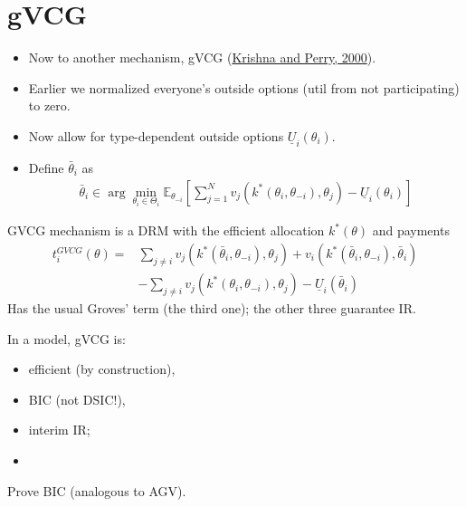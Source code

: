 \documentclass[english,handout]{beamer}		%
\def\lyxframeend{} %
\begin{document}
\section{gVCG}

\begin{itemize}
	\item Now to another mechanism, gVCG (\href{https://sites.google.com/site/vjkrishna/research}{Krishna and Perry, 2000}).
	\item Earlier we normalized everyone's outside options (util from not participating) to zero.
	\item Now allow for type-dependent outside options $\underline{U}_i (\theta_i)$.
	\pause\medskip
	\item Define  $\bar{\theta}_i$ as
	\begin{align*}
	\bar{\theta}_i \in \arg \min_{\theta_i \in \Theta_i} \mathbb{E}_{\theta_{-i}} \left[ \sum_{j=1}^{N} v_j (k^*(\theta_i,\theta_{-i}),\theta_j) - \underline{U}_i (\theta_i) \right]
	\end{align*}
\end{itemize}
\lyxframeend


GVCG mechanism is a DRM with the efficient allocation $k^*(\theta)$ and payments
\begin{align*}
t_i^{GVCG} (\theta) =& \sum_{j \neq i} v_j (k^*(\bar{\theta}_i,\theta_{-i}),\theta_j) + v_i (k^*(\bar{\theta}_i,\theta_{-i}),\bar{\theta}_i)
\\& - \sum_{j \neq i} v_j (k^*(\theta_i,\theta_{-i}),\theta_j) - \underline{U}_i (\bar{\theta}_i)
\end{align*}
\pause
Has the usual Groves' term (the third one); the other three guarantee IR.
\lyxframeend


\begin{theorem}
	In a  model, gVCG is:
	\begin{itemize}
		\item efficient (by construction),
		\item BIC (not DSIC!),
		\item interim IR;
		\item {}
	\end{itemize}
\end{theorem}
Prove BIC (analogous to AGV).
\lyxframeend
\end{document}
